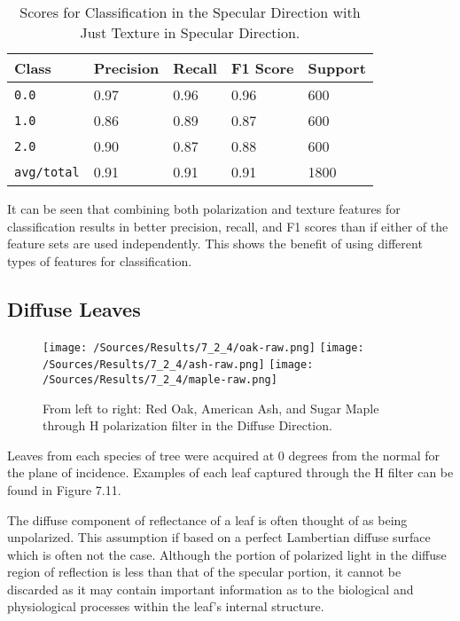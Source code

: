 %
\begin{table}
  \centering
  \begin{tabular}{lllll}
    \toprule
    \textbf{Class} & \textbf{Precision} & \textbf{Recall} & \textbf{F1 Score} & Support\\
    \midrule
      \texttt{0.0} & 0.97 & 0.96 & 0.96 & 600 \\
      \texttt{1.0} & 0.86 & 0.89 & 0.87 & 600 \\
      \texttt{2.0} & 0.90 & 0.87 & 0.88 & 600 \\
      \texttt{avg/total} & 0.91 & 0.91 & 0.91 & 1800 \\
    \bottomrule
  \end{tabular}
  \caption{%
    Scores for Classification in the Specular Direction with Just Texture in Specular Direction.
  }
  \label{tab:Packages}
\end{table}
%
It can be seen that combining both polarization and texture features for classification results in better precision, recall, and F1 scores than if either of the feature sets are used independently.  This shows the benefit of using different types of features for classification.

\subsection{Diffuse Leaves}
%
\begin{figure}[htp]
    \centering
    \texttt{[image: /Sources/Results/7\_2\_4/oak-raw.png]}\hfill
    \texttt{[image: /Sources/Results/7\_2\_4/ash-raw.png]}\hfill
    \texttt{[image: /Sources/Results/7\_2\_4/maple-raw.png]}

    \caption{From left to right: Red Oak, American Ash, and Sugar Maple through H polarization filter in the Diffuse Direction.}
    \label{fig:specular-raw}
\end{figure}
%
Leaves from each species of tree were acquired at 0 degrees from the normal for the plane of incidence.  Examples of each leaf captured through the H filter can be found in Figure 7.11.

The diffuse component of reflectance of a leaf is often thought of as being unpolarized.  This assumption if based on a perfect Lambertian diffuse surface which is often not the case.  Although the portion of polarized light in the diffuse region of reflection is less than that of the specular portion, it cannot be discarded as it may contain important information as to the biological and physiological processes within the leaf's internal structure.


